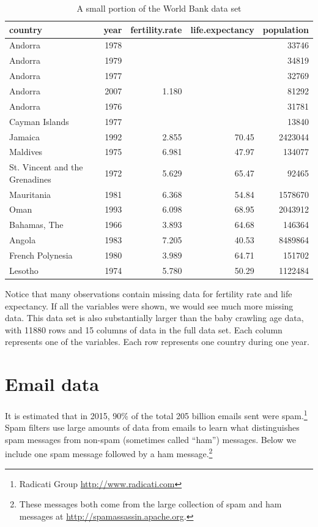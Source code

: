 \documentclass[
]{krantz}
\begin{document}
\begin{table}

\caption{\label{tab:worldBank}A small portion of the World Bank data set}
\centering
\begin{tabular}[t]{lrrrr}
\toprule
country & year & fertility.rate & life.expectancy & population\\
\midrule
Andorra & 1978 &  &  & 33746\\
Andorra & 1979 &  &  & 34819\\
Andorra & 1977 &  &  & 32769\\
Andorra & 2007 & 1.180 &  & 81292\\
Andorra & 1976 &  &  & 31781\\
\addlinespace
Cayman Islands & 1977 &  &  & 13840\\
Jamaica & 1992 & 2.855 & 70.45 & 2423044\\
Maldives & 1975 & 6.981 & 47.97 & 134077\\
St. Vincent and the Grenadines & 1972 & 5.629 & 65.47 & 92465\\
Mauritania & 1981 & 6.368 & 54.84 & 1578670\\
\addlinespace
Oman & 1993 & 6.098 & 68.95 & 2043912\\
Bahamas, The & 1966 & 3.893 & 64.68 & 146364\\
Angola & 1983 & 7.205 & 40.53 & 8489864\\
French Polynesia & 1980 & 3.989 & 64.71 & 151702\\
Lesotho & 1974 & 5.780 & 50.29 & 1122484\\
\bottomrule
\end{tabular}
\end{table}

Notice that many observations contain missing data for fertility rate and life expectancy. If all the variables were shown, we would see much more missing data. This data set is also substantially larger than the baby crawling age data, with 11880 rows and 15 columns of data in the full data set. Each column represents one of the variables. Each row represents one country during one year.

\hypertarget{email-data}{%
\section{Email data}\label{email-data}}

It is estimated that in 2015, 90\% of the total 205 billion emails sent were spam.\footnote{Radicati Group \url{http://www.radicati.com}} Spam filters use large amounts of data from emails to learn what distinguishes spam messages from non-spam (sometimes called ``ham'') messages. Below we include one spam message followed by a ham message.\footnote{These messages both come from the large collection of spam and ham messages at \url{http://spamassassin.apache.org}.}
\end{document}
